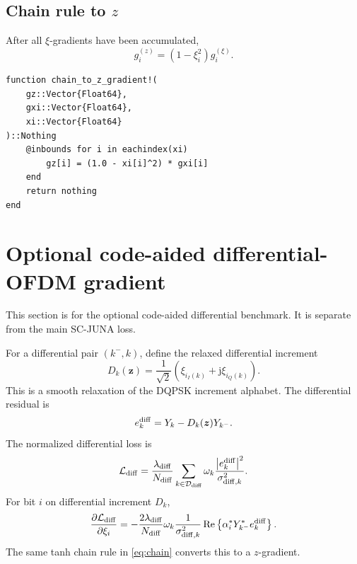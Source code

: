\documentclass[11pt]{article}
\newcommand{\jj}{\mathrm{j}}
\newcommand{\abs}[1]{\left\lvert #1 \right\rvert}
\newcommand{\re}{\operatorname{Re}}
\begin{document}
\subsection{Chain rule to $z$}

After all $\xi$-gradients have been accumulated,
\begin{equation}
 g_i^{(z)}=(1-\xi_i^2)g_i^{(\xi)}.
\label{eq:chain}
\end{equation}

\begin{lstlisting}
function chain_to_z_gradient!(
    gz::Vector{Float64},
    gxi::Vector{Float64},
    xi::Vector{Float64}
)::Nothing
    @inbounds for i in eachindex(xi)
        gz[i] = (1.0 - xi[i]^2) * gxi[i]
    end
    return nothing
end
\end{lstlisting}

\section{Optional code-aided differential-OFDM gradient}
\label{sec:diff-gradient}

This section is for the optional code-aided differential benchmark.  It is separate from the main SC-JUNA loss.

For a differential pair $(k^-,k)$, define the relaxed differential increment
\begin{equation}
D_k(\bm z)=\frac{1}{\sqrt2}\left(\xi_{i_I(k)}+\jj\xi_{i_Q(k)}\right).
\end{equation}
This is a smooth relaxation of the DQPSK increment alphabet.  The differential residual is
\begin{equation}
 e_k^{\rm diff}=Y_k-D_k(\bm z)Y_{k^-}.
\end{equation}
The normalized differential loss is
\begin{equation}
\mathcal L_{\rm diff}
=\frac{\lambda_{\rm diff}}{N_{\rm diff}}
\sum_{k\in\mathcal D_{\rm diff}}
\omega_k\frac{\abs{e_k^{\rm diff}}^2}{\sigma_{{\rm diff},k}^2}.
\end{equation}
For bit $i$ on differential increment $D_k$,
\begin{equation}
\frac{\partial\mathcal L_{\rm diff}}{\partial\xi_i}
= -\frac{2\lambda_{\rm diff}}{N_{\rm diff}}
\omega_k\frac{1}{\sigma_{{\rm diff},k}^2}
\re\left\{\alpha_i^*Y_{k^-}^*e_k^{\rm diff}\right\}.
\label{eq:grad_diff}
\end{equation}
The same tanh chain rule in \eqref{eq:chain} converts this to a $z$-gradient.
\end{document}
